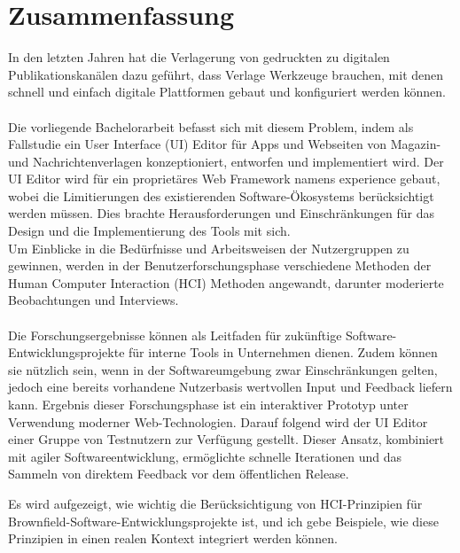 %

\chapter*{Zusammenfassung}

In den letzten Jahren hat die Verlagerung von gedruckten zu digitalen Publikationskanälen dazu geführt, dass Verlage Werkzeuge brauchen, mit denen schnell und einfach digitale Plattformen gebaut und konfiguriert werden können.
\\\\
Die vorliegende Bachelorarbeit befasst sich mit diesem Problem, indem als Fallstudie ein User Interface (UI) Editor für Apps und Webseiten von Magazin- und Nachrichtenverlagen konzeptioniert, entworfen und implementiert wird.
Der UI Editor wird für ein proprietäres Web Framework namens \Gls{experience} gebaut, wobei die Limitierungen des existierenden Software-Ökosystems berücksichtigt werden müssen.
Dies brachte Herausforderungen und Einschränkungen für das Design und die Implementierung des Tools mit sich.
\\
Um Einblicke in die Bedürfnisse und Arbeitsweisen der Nutzergruppen zu gewinnen, werden in der Benutzerforschungsphase verschiedene Methoden der Human Computer Interaction (HCI)
Methoden angewandt, darunter moderierte Beobachtungen und Interviews.
\\\\
Die Forschungsergebnisse können als Leitfaden für zukünftige Software-Entwicklungsprojekte für interne Tools in Unternehmen dienen.
Zudem können sie nützlich sein, wenn in der Softwareumgebung zwar Einschränkungen gelten, jedoch eine bereits vorhandene Nutzerbasis wertvollen Input und Feedback liefern kann.
Ergebnis dieser Forschungsphase ist ein interaktiver Prototyp unter Verwendung moderner Web-Technologien. Darauf folgend wird der UI Editor einer Gruppe von Testnutzern zur Verfügung gestellt.
Dieser Ansatz, kombiniert mit agiler Softwareentwicklung, ermöglichte schnelle Iterationen und das Sammeln von direktem Feedback vor dem öffentlichen Release.

Es wird aufgezeigt, wie wichtig die Berücksichtigung von HCI-Prinzipien für Brownfield-Software-Entwicklungsprojekte ist, und ich gebe Beispiele, wie diese Prinzipien in einen realen Kontext integriert werden können.